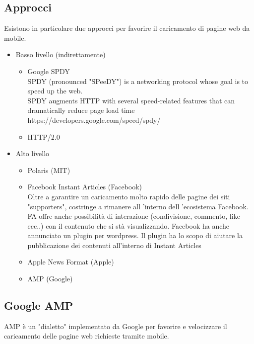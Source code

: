 \documentclass{article}
\begin{document}
\subsection{Approcci}
Esistono in particolare due approcci per favorire il caricamento di pagine web da mobile.
\begin{itemize}
    \item Basso livello (indirettamente)
    \begin{itemize}
        \item Google SPDY\\ 
        SPDY (pronounced "SPeeDY") is a networking protocol whose goal is to speed up the web.\\
        SPDY augments HTTP with several speed-related features that can dramatically reduce page load time\\
        https://developers.google.com/speed/spdy/
        \item HTTP/2.0
    \end{itemize}

    \item Alto livello
    \begin{itemize}
        \item Polaris (MIT)
        \item Facebook Instant Articles (Facebook)\\
        Oltre a garantire un caricamento molto rapido delle pagine dei siti "supporters", costringe a rimanere all ’interno dell ’ecosistema Facebook.
FA offre anche possibilità di interazione (condivisione, commento, like ecc..) con il contenuto che si stà visualizzando.
Facebook ha anche annunciato un plugin per wordpress. Il plugin ha lo scopo di aiutare la pubblicazione dei contenuti all’interno di Instant Articles

        \item Apple News Format (Apple)
        \item AMP (Google)
    \end{itemize}
\end{itemize}

\subsection{Google AMP}
AMP è un "dialetto" implementato da Google per favorire e velocizzare il caricamento delle pagine web richieste tramite mobile.
\end{document}
